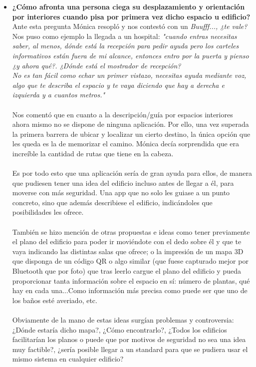 \documentclass{article}
\begin{document}
\begin{itemize}
		\item \textbf{¿Cómo afronta una persona ciega su desplazamiento y orientación por interiores cuando pisa por primera vez dicho espacio u edificio?}
		\\
		Ante esta pregunta Mónica resopló y nos contestó con un \textit{Buufff..., ¿te vale?}
		\\
		Nos puso como ejemplo la llegada a un hospital: \textit{"cuando entras necesitas saber, al menos, dónde está la recepción para pedir ayuda pero los carteles informativos están fuera de mi alcance, entonces entro por la puerta y pienso ¿y ahora qué?. ¿Dónde está el mostrador de recepción? 
		\\
		No es tan fácil como echar un primer vistazo, necesitas ayuda mediante voz, algo que te describa el espacio y te vaya diciendo que hay a derecha e izquierda y a cuantos metros."}
		\\
		\\
		Nos comentó que en cuanto a la descripción/guía por espacios interiores ahora mismo no se dispone de ninguna aplicación. Por ello, una vez superada la primera barrera de ubicar y localizar un cierto destino, la única opción que les queda es la de memorizar el camino. Mónica decía sorprendida que era increíble la cantidad de rutas que tiene en la cabeza.
		\\
		\\
		Es por todo esto que una aplicación sería de gran ayuda para ellos, de manera que pudiesen tener una idea del edificio incluso antes de llegar a él, para moverse con más seguridad. Una app que no solo les guiase a un punto concreto, sino que además describiese el edificio, indicándoles que posibilidades les ofrece.
		\\
		\\
		También se hizo mención de otras propuestas e ideas como tener previamente el plano del edificio para poder ir moviéndote con el dedo sobre él y que te vaya indicando las distintas salas que ofrece; o la impresión de un mapa 3D que disponga de un código QR o algo similar (que fuese capturado mejor por Bluetooth que por foto) que tras leerlo cargue el plano del edificio y pueda proporcionar tanta información sobre el espacio en sí: número de plantas, qué hay en cada una...Como información más precisa como puede ser que uno de los baños esté averiado, etc.
		\\ 
		\\
		Obviamente de la mano de estas ideas surgían problemas y controversia: ¿Dónde estaría dicho mapa?, ¿Cómo encontrarlo?, ¿Todos los edificios facilitarían los planos o puede que por motivos de seguridad no sea una idea muy factible?, ¿sería posible llegar a un standard para que se pudiera usar el mismo sistema en cualquier edificio?
		\\
		 

\end{itemize}
\end{document}
